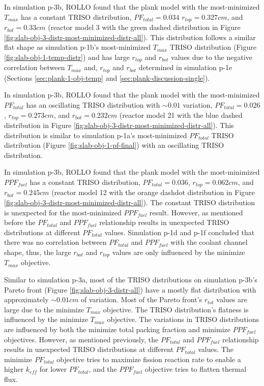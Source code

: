 In simulation p-3b, \gls{ROLLO} found that the plank model with the most-minimized 
$T_{max}$ has a constant TRISO distribution, $PF_{total} = 0.034$ $r_{top}=0.327cm$, 
and $r_{bot}=0.33cm$ (reactor model 3 with the green dashed distribution in Figure 
\ref{fig:slab-obj-3-distr-most-minimized-distr-all}).
This distribution follows a similar flat shape as simulation p-1b's most-minimized 
$T_{max}$ TRISO distribution (Figure \ref{fig:slab-obj-1-temp-distr}) and has large 
$r_{top}$ and $r_{bot}$ values due to the negative correlation between $T_{max}$ 
and, $r_{top}$ and $r_{bot}$ determined in simulation p-1e 
(Sections \ref{sec:plank-1-obj-temp} and \ref{sec:plank-discussion-single}). 

In simulation p-3b, \gls{ROLLO} found that the plank model with the most-minimized 
$PF_{total}$ has an oscillating TRISO distribution with ${\sim}0.01$ variation,
$PF_{total} = 0.026$, $r_{top}=0.273cm$, and $r_{bot}=0.232cm$ (reactor model 21 
with the blue dashed distribution in Figure 
\ref{fig:slab-obj-3-distr-most-minimized-distr-all}).
This distribution is similar to simulation p-1a's most-minimized $PF_{total}$ TRISO 
distribution (Figure \ref{fig:slab-obj-1-pf-final}) with an oscillating TRISO 
distribution.

In simulation p-3b, \gls{ROLLO} found that the plank model with the most-minimized 
$PPF_{fuel}$ has a constant TRISO distribution, $PF_{total} = 0.036$, 
$r_{top}=0.062cm$, and $r_{bot}=0.245cm$ (reactor model 12 with the orange dashdot 
distribution in Figure \ref{fig:slab-obj-3-distr-most-minimized-distr-all}).
The constant TRISO distribution is unexpected for the most-minimized $PPF_{fuel}$ 
result. 
However, as mentioned before the $PF_{total}$ and $PPF_{fuel}$ relationship
results in unexpected TRISO distributions at different $PF_{total}$ values. 
Simulation p-1d and p-1f concluded that there was no correlation between $PF_{total}$ 
and $PPF_{fuel}$ with the coolant channel shape, thus, the large $r_{bot}$ and $r_{top}$ 
values are only influenced by the minimize $T_{max}$ objective. 

Similar to simulation p-3a, most of the \gls{TRISO} distributions on simulation 
p-3b's Pareto front (Figure \ref{fig:slab-obj-3-distr-all}) have a mostly flat 
distribution with approximately ${\sim}0.01cm$ of variation. 
Most of the Pareto front's $r_{tot}$ values are large due to the minimize $T_{max}$ 
objective. 
The TRISO distribution's flatness is influenced by the minimize $T_{max}$ objective. 
The variations in \gls{TRISO} distributions are influenced by both the minimize 
total packing fraction and minimize $PPF_{fuel}$ objectives. 
However, as mentioned previously, the $PF_{total}$ and $PPF_{fuel}$ relationship
results in unexpected TRISO distributions at different $PF_{total}$ values. 
The minimize $PF_{total}$ objective tries to maximize fission reaction rate
to enable a higher $k_{eff}$ for lower $PF_{total}$, and 
the $PPF_{fuel}$ objective tries to flatten thermal flux. 

